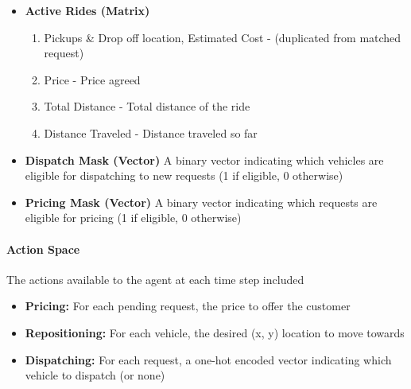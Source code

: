 \documentclass[11pt]{article}
\begin{document}
\begin{itemize}
\begin{enumerate}
						\item Drop-off Location (Y coordinate) - Normalized to [-1, 1]
						\item Cust bias (coefficient representing customers' base willingness to pay)
						\item Cust temperature (coefficient representing customers' sensitivity to price changes)
						\item Estimated Cost (linear product of distance and a per-unit distance cost)
						\item Max Wait Time (in time steps) - Maximum time a customer is willing to wait for pickup once
								they've accepted the price
						\item Wait Time (in time steps) - Current time the customer has been waiting for pickup
						\item Status: {Expired, Price Rejected, Awaiting Price, Accepted Price (awaiting pickup), Assigned
								(vehicle en route), In-Transit} - One-hot encoded
				\end{enumerate}
		\item \textbf{Active Rides (Matrix)}
				\begin{enumerate}
						\item Pickups \& Drop off location, Estimated Cost - (duplicated from matched request)
						\item Price - Price agreed
						\item Total Distance - Total distance of the ride
						\item Distance Traveled - Distance traveled so far
				\end{enumerate}
		\item \textbf{Dispatch Mask (Vector)} A binary vector indicating which vehicles are eligible for
				dispatching to new requests (1 if eligible, 0 otherwise)
		\item \textbf{Pricing Mask (Vector)} A binary vector indicating which requests are eligible for pricing (1
				if eligible, 0 otherwise)
\end{itemize}

\paragraph{Action Space} The actions available to the agent at each time step included
\begin{itemize}
		\item \textbf{Pricing:} For each pending request, the price to offer the customer
		\item \textbf{Repositioning:} For each vehicle, the desired (x, y) location to move towards
		\item \textbf{Dispatching:} For each request, a one-hot encoded vector indicating which vehicle to dispatch (or none)
\end{itemize}
\end{document}
